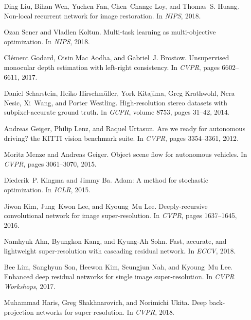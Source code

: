 \documentclass[10pt,twocolumn,letterpaper]{article}
\begin{document}
\begin{thebibliography}{10}
	Ding Liu, Bihan Wen, Yuchen Fan, Chen~Change Loy, and Thomas~S. Huang.
	\newblock Non-local recurrent network for image restoration.
	\newblock In {\em NIPS}, 2018.
	
	Ozan Sener and Vladlen Koltun.
	\newblock Multi-task learning as multi-objective optimization.
	\newblock In {\em NIPS}, 2018.
	
	Cl{\'{e}}ment Godard, Oisin {Mac Aodha}, and Gabriel~J. Brostow.
	\newblock Unsupervised monocular depth estimation with left-right consistency.
	\newblock In {\em CVPR}, pages 6602--6611, 2017.
	
	Daniel Scharstein, Heiko Hirschm{\"{u}}ller, York Kitajima, Greg Krathwohl,
	Nera Nesic, Xi~Wang, and Porter Westling.
	\newblock High-resolution stereo datasets with subpixel-accurate ground truth.
	\newblock In {\em GCPR}, volume 8753, pages 31--42, 2014.
	
	Andreas Geiger, Philip Lenz, and Raquel Urtasun.
	\newblock Are we ready for autonomous driving? the {KITTI} vision benchmark
	suite.
	\newblock In {\em CVPR}, pages 3354--3361, 2012.
	
	Moritz Menze and Andreas Geiger.
	\newblock Object scene flow for autonomous vehicles.
	\newblock In {\em CVPR}, pages 3061--3070, 2015.
	
	Diederik~P. Kingma and Jimmy Ba.
	\newblock Adam: {A} method for stochastic optimization.
	\newblock In {\em ICLR}, 2015.
	
	Jiwon Kim, Jung~Kwon Lee, and Kyoung~Mu Lee.
	\newblock Deeply-recursive convolutional network for image super-resolution.
	\newblock In {\em CVPR}, pages 1637--1645, 2016.
	
	Namhyuk Ahn, Byungkon Kang, and Kyung{-}Ah Sohn.
	\newblock Fast, accurate, and lightweight super-resolution with cascading
	residual network.
	\newblock In {\em ECCV}, 2018.
	
	Bee Lim, Sanghyun Son, Heewon Kim, Seungjun Nah, and Kyoung~Mu Lee.
	\newblock Enhanced deep residual networks for single image super-resolution.
	\newblock In {\em CVPR Workshops}, 2017.
	
	Muhammad Haris, Greg Shakhnarovich, and Norimichi Ukita.
	\newblock Deep back-projection networks for super-resolution.
	\newblock In {\em CVPR}, 2018.
	
\end{thebibliography}
\end{document}
